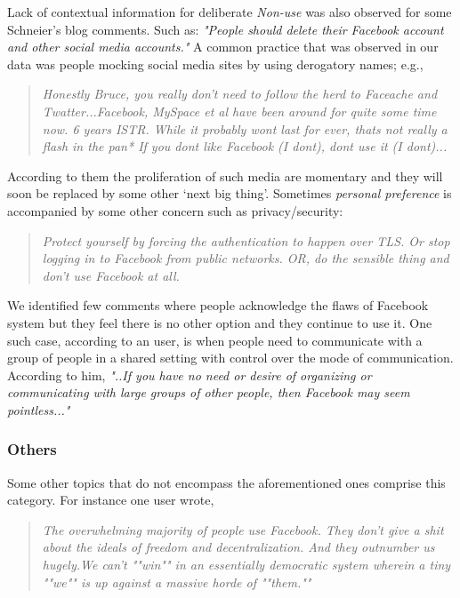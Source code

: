     Lack of contextual information for deliberate \emph{Non-use} was also observed for some Schneier's blog comments. Such as: \textit{"People should delete their Facebook account and other social media accounts."} A common practice that was observed in our data was people mocking social media sites by using derogatory names; e.g.,
    
    \begin{quote}
         \textit{Honestly Bruce, you really don't need to follow the herd to Faceache and Twatter...Facebook, MySpace et al have been around for quite some time now. 6 years ISTR. While it probably wont last for ever, thats not really a flash in the pan* If you dont like Facebook (I dont), dont use it (I dont)...}
    \end{quote}
    
    According to them the proliferation of such media are momentary and they will soon be replaced by some other `next big thing'. Sometimes \textit{personal preference} is accompanied by some other concern such as privacy/security:
    \begin{quote}
         \textit{Protect yourself by forcing the authentication to happen over TLS. Or stop logging in to Facebook from public networks. OR, do the sensible thing and don't use Facebook at all.}
    \end{quote}
    
    We identified few comments where people acknowledge the flaws of Facebook system but they feel there is no other option and they continue to use it. One such case, according to an user, is when people need to communicate with a group of people in a shared setting with control over the mode of communication. According to him, \textit{"..If you have no need or desire of organizing or communicating with large groups of other people, then Facebook may seem pointless..."}
    
\subsubsection{Others}

Some other topics that do not encompass the aforementioned ones comprise this category. For instance one user wrote, 
\begin{quote}
         \textit{The overwhelming majority of people use Facebook. They don't give a shit about the ideals of freedom and decentralization. And they outnumber us hugely.We can't ""win"" in an essentially democratic system wherein a tiny ""we"" is up against a massive horde of ""them.""}
    \end{quote}

